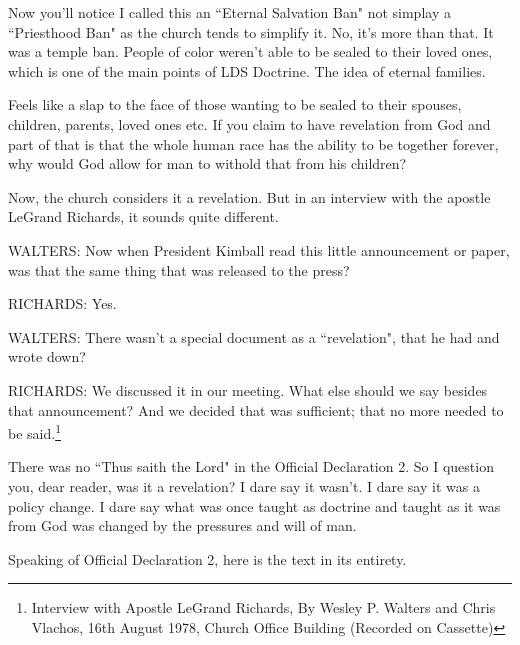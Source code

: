 \documentclass{article}
\begin{document}
Now you'll notice I called this an ``Eternal Salvation Ban" not simplay a 
``Priesthood Ban" as the church tends to simplify it. No, it's more than that.
It was a temple ban. People of color weren't able to be sealed to their loved
ones, which is one of the main points of LDS Doctrine. The idea of eternal
families.

Feels like a slap to the face of those wanting to be sealed to their spouses,
children, parents, loved ones etc. If you claim to have revelation from God and
part of that is that the whole human race has the ability to be together 
forever, why would God allow for man to withold that from his children?

Now, the church considers it a revelation. But in an interview with the apostle
LeGrand Richards, it sounds quite different.

\begin{displayquote}
WALTERS: Now when President Kimball read this little announcement or paper, 
was that the same thing that was released to the press?

RICHARDS: Yes.

WALTERS: There wasn't a special document as a ``revelation", that he had and 
wrote down?

RICHARDS: We discussed it in our meeting. What else should we say besides 
that announcement? And we decided that was sufficient; that no more 
needed to be said.\footnote{Interview with Apostle LeGrand Richards,
By Wesley P. Walters and Chris Vlachos, 16th August 1978, Church Office Building
(Recorded on Cassette)}
\end{displayquote}

There was no ``Thus saith the Lord" in the Official Declaration 2. So I question
you, dear reader, was it a revelation? I dare say it wasn't. I dare say it was
a policy change. I dare say what was once taught as doctrine and taught as it
was from God was changed by the pressures and will of man.

Speaking of Official Declaration 2, here is the text in its entirety.
\end{document}

